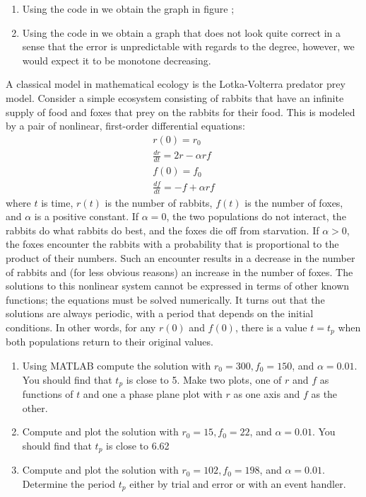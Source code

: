 \documentclass[a4paper, oneside]{article}
\begin{document}
\begin{solution}
\begin{enumerate}
    \item Using the code in  we obtain the graph in figure ;
    \item Using the code in  we obtain a graph that does not look quite correct in a sense that the error is unpredictable with regards to the degree, however, we would expect it to be monotone decreasing. 
\end{enumerate}
\end{solution}
\begin{problem}
    A classical model in mathematical ecology is the Lotka-Volterra predator prey model. Consider a simple ecosystem consisting of rabbits that have an infinite supply of food and foxes that prey on the rabbits for their food. This is modeled by a pair of nonlinear, first-order differential equations:
    \begin{align}
        r(0) = r_0 \\
        \frac{dr}{dt} = 2r - \alpha r f \\
        f(0) = f_0 \\
        \frac{df}{dt} = -f + \alpha r f
    \end{align}
    where $t$ is time, $r(t)$ is the number of rabbits, $f(t)$ is the number of foxes, and $\alpha$ is a positive constant. If $\alpha = 0$, the two populations do not interact, the rabbits do what rabbits do best, and the foxes die off from starvation. If $\alpha > 0$, the foxes encounter the rabbits with a probability that is proportional to the product of their numbers. Such an encounter results in a decrease in the number of rabbits and (for less obvious reasons) an increase in the number of foxes. The solutions to this nonlinear system cannot be expressed in terms of other known functions; the equations must be solved numerically. It turns out that the solutions are always periodic, with a period that depends on the initial conditions. In other words, for any $r(0)$ and $f(0)$, there is a value $t = t_p$ when both populations return to their original values.

    \begin{enumerate}
        \item Using MATLAB compute the solution with $r_0 = 300, f_0 = 150$, and $\alpha = 0.01$. You should find that $t_p$ is close to 5. Make two plots, one of $r$ and $f$ as functions of $t$ and one a phase plane plot with $r$ as one axis and $f$ as the other.
        \item Compute and plot the solution with $r_0 = 15, f_0 = 22$, and $\alpha = 0.01$. You should find that $t_p$ is close to 6.62
        \item Compute and plot the solution with $r_0 = 102, f_0 = 198$, and $\alpha = 0.01$. Determine the period $t_p$ either by trial and error or with an event
        handler.
    \end{enumerate}
\end{problem}
\end{document}
